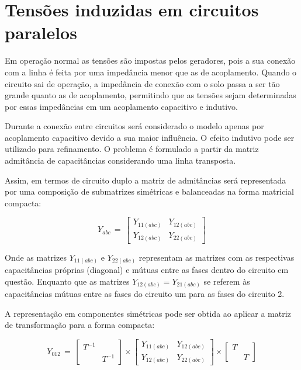 \section{Tensões induzidas em circuitos paralelos}

Em operação normal as tensões são impostas pelos geradores, pois a sua conexão com a linha é feita por uma impedância menor que as de acoplamento. Quando o circuito sai de operação, a impedância de conexão com o solo passa a ser tão grande quanto as de acoplamento, permitindo que as tensões sejam determinadas por essas impedâncias em um acoplamento capacitivo e indutivo.

Durante a conexão entre circuitos será considerado o modelo apenas por acoplamento capacitivo devido a sua maior influência. O efeito indutivo pode ser utilizado para refinamento. O problema é formulado a partir da matriz admitância de capacitâncias considerando uma linha transposta.

Assim, em termos de circuito duplo a matriz de admitâncias será representada por uma composição de submatrizes simétricas e balanceadas na forma matricial compacta:

\begin{equation} \label{slide:3:1}
    Y_{abc} \, = \,\begin{bmatrix} Y_{11(abc)} & Y_{12(abc)} \\ Y_{12(abc)} & Y_{22(abc)}   \end{bmatrix}
\end{equation}

Onde as matrizes $Y_{11(abc)}$ e  $Y_{22(abc)}$ representam as matrizes com as respectivas capacitâncias próprias (diagonal) e mútuas entre as fases dentro do circuito em questão. Enquanto que as matrizes $Y_{12(abc)}=Y_{21(abc)}$ se referem às capacitâncias mútuas entre as fases do circuito um para as fases do circuito 2.

A representação em componentes simétricas pode ser obtida ao aplicar a matriz de transformação para a forma compacta:

\begin{equation} \label{slide:3:2}
    Y_{012} \, = \, \begin{bmatrix} T^{-1} &   \\  & T^{-1}  \end{bmatrix}  \times \begin{bmatrix} Y_{11(abc)} & Y_{12(abc)} \\ Y_{12(abc)} & Y_{22(abc)}   \end{bmatrix} \times \begin{bmatrix} T &   \\  & T  \end{bmatrix} 
\end{equation}

